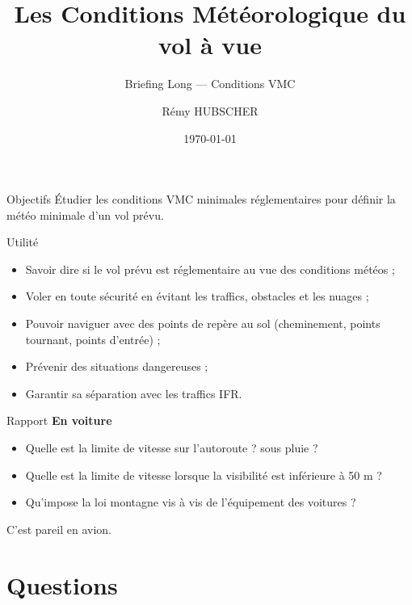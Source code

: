 \documentclass{beamer}
\author{Rémy HUBSCHER}
\begin{document}
  \title[Briefing Long — Conditions VMC]{Les Conditions Météorologique du vol à vue}
  \subtitle{Briefing Long — Conditions VMC}
\date{\today} 

\begin{frame}[plain]
  \titlepage
\end{frame}

\begin{frame}{Objectifs}
  Étudier les conditions VMC minimales réglementaires pour définir la
  météo minimale d'un vol prévu.
\end{frame}

\begin{frame}{Utilité}
  \begin{itemize} 
    \item Savoir dire si le vol prévu est réglementaire au vue des conditions météos ; \pause
    \item Voler en toute sécurité en évitant les traffics, obstacles et les nuages ; \pause
    \item Pouvoir naviguer avec des points de repère au sol (cheminement, points tournant, points d'entrée) ; \pause
    \item Prévenir des situations dangereuses ; \pause
    \item Garantir sa séparation avec les traffics IFR.
  \end{itemize}  
\end{frame}

\begin{frame}{Rapport}
  \textbf{En voiture}
  
  \begin{itemize}
    \item Quelle est la limite de vitesse sur l'autoroute ? \pause sous pluie ? \pause
    \item Quelle est la limite de vitesse lorsque la visibilité est inférieure à 50 m ? \pause
    \item Qu'impose la loi montagne vis à vis de l'équipement des voitures ? \pause
  \end{itemize}

  \vspace*{1em}
  \pause
  
  \vspace*{1em}
  C'est pareil en avion.
\end{frame}

\section{Questions}
\end{document}

